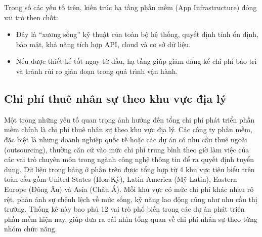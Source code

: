     \begin{flushleft}
      \hspace*{0.8cm}Trong số các yếu tố trên, kiến trúc hạ tầng phần mềm (App Infrastructure) đóng vai trò then chốt:
      \setlength{\leftmargini}{1.5cm}
      \begin{itemize}
          \item Đây là “xương sống” kỹ thuật của toàn bộ hệ thống, quyết định tính ổn định, bảo mật, khả năng tích hợp API, cloud và cơ sở dữ liệu.
          \item Nếu được thiết kế tốt ngay từ đầu, hạ tầng giúp giảm đáng kể chi phí bảo trì và tránh rủi ro gián đoạn trong quá trình vận hành.
      \end{itemize}
    \end{flushleft}

\subsection{Chi phí thuê nhân sự theo khu vực địa lý}
\renewcommand{\labelitemi}{--}    
    \begin{flushleft}
        \hspace*{0.8cm}Một trong những yếu tố quan trọng ảnh hưởng đến tổng chi phí phát triển phần mềm chính là chi phí thuê nhân sự theo khu vực địa lý. Các công ty phần mềm, đặc biệt là những doanh nghiệp quốc tế hoặc các dự án có nhu cầu thuê ngoài (outsourcing), thường căn cứ vào mức chi phí trung bình theo giờ làm việc của các vai trò chuyên môn trong ngành công nghệ thông tin để ra quyết định tuyển dụng. Dữ liệu trong bảng ở phần trên được tổng hợp từ 4 khu vực tiêu biểu trên toàn cầu gồm United States (Hoa Kỳ), Latin America (Mỹ Latin), Eastern Europe (Đông Âu) và Asia (Châu Á). Mỗi khu vực có mức chi phí khác nhau rõ rệt, phản ánh sự chênh lệch về mức sống, kỹ năng lao động cũng như nhu cầu thị trường. Thống kê này bao phủ 12 vai trò phổ biến trong các dự án phát triển phần mềm hiện nay, giúp đưa ra cái nhìn tổng quan về chi phí nhân sự theo từng nhóm chức năng.
    \end{flushleft}

